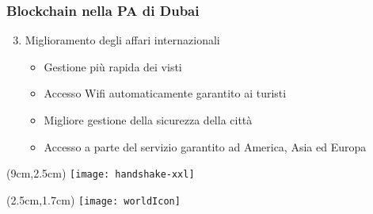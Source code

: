 \begin{frame}
 \frametitle{Blockchain nella PA di Dubai}

 \begin{enumerate}
 \setcounter{enumi}{2}
  \item<1-> Miglioramento degli affari internazionali
  \begin{itemize}
   \item<2-> Gestione pi\`u rapida dei visti
   \item<3-> Accesso Wifi automaticamente garantito ai turisti
   \item<4-> Migliore gestione della sicurezza della citt\`a
   \item<5-> Accesso a parte del servizio garantito ad America, Asia ed Europa
  \end{itemize}

 \end{enumerate}
 
 
 \begin{textblock*}{5cm}(9cm,2.5cm)
  \texttt{[image: handshake-xxl]}
 \end{textblock*}
 
 \begin{textblock*}{5cm}(2.5cm,1.7cm)
  \texttt{[image: worldIcon]}
 \end{textblock*}

\end{frame}
